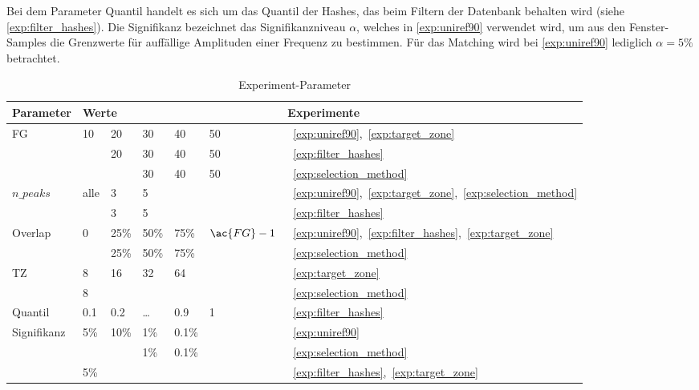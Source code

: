         \begin{table}[H]
            \centering
            \caption{Experiment-Parameter}
            \label{tab:parameter}
            \begin{minipage}{\textwidth}
                Bei dem Parameter Quantil handelt es sich um das Quantil der Hashes, das beim Filtern der Datenbank behalten wird (siehe \autoref{exp:filter_hashes}). Die Signifikanz bezeichnet das Signifikanzniveau $\alpha$, welches in \autoref{exp:uniref90} verwendet wird, um aus den Fenster-Samples die Grenzwerte für auffällige Amplituden einer Frequenz zu bestimmen. Für das Matching wird bei \autoref{exp:uniref90} lediglich $\alpha=5\%$ betrachtet.
            \end{minipage}
            \begin{tabular}{lllllll}
            \toprule
             \textbf{Parameter} & \multicolumn{5}{l}{\textbf{Werte}} & \textbf{Experimente}\\
             \midrule
             \acf{FG}    & 10 & 20    & 30     & 40     & 50        &~\ref{exp:uniref90},~\ref{exp:target_zone}\\
                         &    & 20    & 30     & 40     & 50        &~\ref{exp:filter_hashes}\\
                         &    &       & 30     & 40     & 50        &~\ref{exp:selection_method}\\
             $n\_peaks$  &alle& 3     & 5      &        &           &~\ref{exp:uniref90},~\ref{exp:target_zone},~\ref{exp:selection_method}\\
                         &    & 3     & 5      &        &           &~\ref{exp:filter_hashes}\\
             Overlap     & 0  & 25\%  & 50\%   & 75\%   &$\ac{FG}-1$&~\ref{exp:uniref90},~\ref{exp:filter_hashes},~\ref{exp:target_zone}\\
                         &    & 25\%  & 50\%   & 75\%   &           &~\ref{exp:selection_method}\\
             \acl{TZ}    & 8  & 16    & 32     & 64     &           &~\ref{exp:target_zone}\\
                         & 8  &       &        &        &           &~\ref{exp:selection_method}\\
             Quantil     &0.1 & 0.2   & \dots  & 0.9    &     1     &~\ref{exp:filter_hashes}\\
             Signifikanz &5\% & 10\%  &   1\%  & 0.1\%  &           &~\ref{exp:uniref90}\\
                         &    &       &   1\%  & 0.1\%  &           &~\ref{exp:selection_method}\\
                         &5\% &       &        &        &           &~\ref{exp:filter_hashes},~\ref{exp:target_zone}\\
             \bottomrule
            \end{tabular}
        \end{table}
